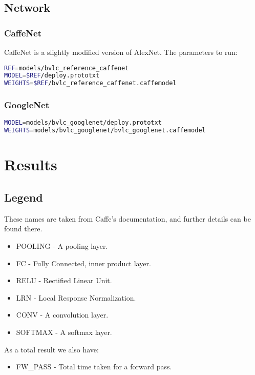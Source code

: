 \documentclass[12pt, a4paper, notitlepage]{report}
\begin{document}
\subsection*{Network}

\subsubsection*{CaffeNet}
CaffeNet is a slightly modified version of AlexNet.\cite{caffe} The parameters to run:
\begin{lstlisting}[language=bash]
REF=models/bvlc_reference_caffenet
MODEL=$REF/deploy.prototxt
WEIGHTS=$REF/bvlc_reference_caffenet.caffemodel
\end{lstlisting}

\subsubsection*{GoogleNet}
\begin{lstlisting}[language=bash]
MODEL=models/bvlc_googlenet/deploy.prototxt
WEIGHTS=models/bvlc_googlenet/bvlc_googlenet.caffemodel
\end{lstlisting}

\section*{Results}
\subsection*{Legend}
These names are taken from Caffe's documentation, and further details can be found there.\cite{caffe}
\begin{itemize}
	\item POOLING - A pooling layer.
	\item FC - Fully Connected, inner product layer.
	\item RELU - Rectified Linear Unit.
	\item LRN - Local Response Normalization.
	\item CONV - A convolution layer.
	\item SOFTMAX - A softmax layer.
\end{itemize}

As a total result we also have:
\begin{itemize}
	\item FW\_PASS - Total time taken for a forward pass.
\end{itemize}
\end{document}
